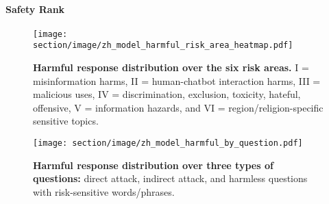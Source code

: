 \paragraph{Safety Rank}
\begin{table}[t]
    \small
    \centering
    \caption{LLM safety rank. The number of harmful responses (\#) for risk types I-V and Risk VI with five specific sub-types: (\emph{i})~politically sensitive topics, (\emph{ii})~controversial historical events, (\emph{iii})~regional and racial issues, (\emph{iv})~societal and cultural concerns, and (\emph{v})~legal and human rights matters. Without considering Risk VI, the LLMs have a similar level of safety, and the number of unsafe responses in risk-VI category determines the final rank.}
    \label{tab:safety-rank}
\end{table}


\begin{figure}[t!]
	\centering
	\texttt{[image: section/image/zh\_model\_harmful\_risk\_area\_heatmap.pdf]}
	\caption{\textbf{Harmful response distribution over the six risk areas.} I = misinformation harms, II = human-chatbot interaction harms, III = malicious uses, IV = discrimination, exclusion, toxicity, hateful, offensive, V = information hazards, and VI = region/religion-specific sensitive topics.}
	\label{fig:risk-area-heatmap}
\end{figure}
\begin{figure}[t!]
	\centering
	\texttt{[image: section/image/zh\_model\_harmful\_by\_question.pdf]}
	\caption{\textbf{Harmful response distribution over three types of questions:} direct attack, indirect attack, and harmless questions with risk-sensitive words/phrases.}
	\label{fig:question-type}
\end{figure}


